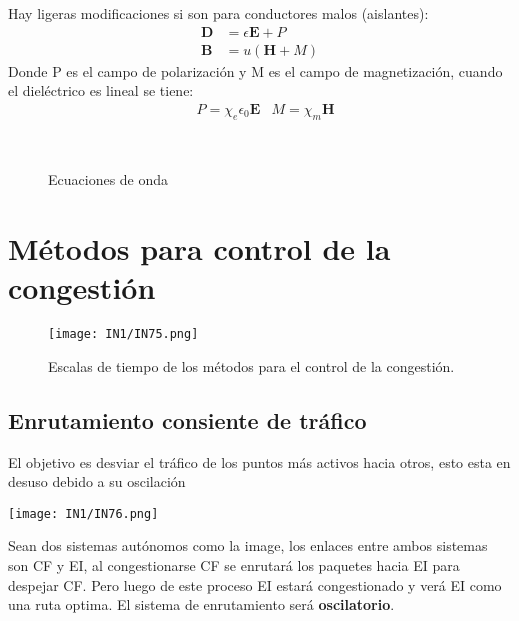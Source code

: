 \documentclass[12pt,fleqn,a4paper,oneside]{LegrandOrangeBook}
\begin{document}
Hay ligeras modificaciones si son para conductores malos (aislantes):
\begin{subequations}
\begin{align}
\textbf{D}&= \epsilon \textbf{E} + P\\
\textbf{B}&=u(\textbf{H} + M)
\end{align}
\end{subequations}
Donde P es el campo de polarización y M es el campo de magnetización, cuando el dieléctrico es lineal se tiene:
\begin{align*}
&P=\chi_e\epsilon_0\textbf{E} &M=\chi_m\textbf{H}
\end{align*}
\begin{figure}[H]
\centering
{}\\
\caption{Ecuaciones de onda}
\end{figure}
\section{Métodos para control de la congestión}
\begin{figure}[H]
\centering
\texttt{[image: IN1/IN75.png]}
\caption{Escalas de tiempo de los métodos para el control de la congestión.}
\end{figure}
\subsection{Enrutamiento consiente de tráfico}
El objetivo es desviar el tráfico de los puntos más activos hacia otros, esto esta en desuso debido a su oscilación
\begin{center}
\texttt{[image: IN1/IN76.png]}
\end{center}
Sean dos sistemas autónomos como la image, los enlaces entre ambos sistemas son CF y EI, al congestionarse CF se enrutará los paquetes hacia EI para despejar CF. Pero luego de este proceso EI estará congestionado y verá EI como una ruta optima. El sistema de enrutamiento será \textbf{oscilatorio}.
\end{document}
